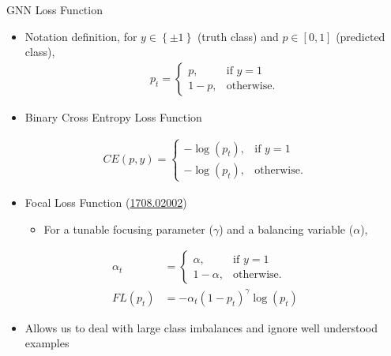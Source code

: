 \documentclass[xcolor=table,aspectratio=169]{beamer}
\begin{document}
\begin{frame}{GNN Loss Function}
    \begin{itemize}
        \item Notation definition, for \(y\in \left\{\pm 1\right\}\) (truth class) and \( p \in \left[ 0, 1 \right] \) (predicted class),
        \begin{align*}
            p_t = \left\{\begin{array}{lr}
                p, & \text{if } y=1\\
                1-p, & \text{otherwise.}
                \end{array}\right.
        \end{align*}
        \item Binary Cross Entropy Loss Function
    \end{itemize}
    \begin{align*}
        CE(p,y) = \left\{\begin{array}{lr}
            -\log(p_t), & \text{if } y=1\\
            -\log(p_t), & \text{otherwise.}
            \end{array}\right.
    \end{align*}
    \begin{itemize}
        \item Focal Loss Function (\href{https://arxiv.org/pdf/1708.02002}{1708.02002})
        \begin{itemize}
            \item For a tunable focusing parameter (\(\gamma\)) and a balancing variable (\(\alpha\)),
        \end{itemize}
    \end{itemize}
    \begin{align*}
        \alpha_t &= \left\{\begin{array}{lr}
                \alpha, & \text{if } y=1\\
                1-\alpha, & \text{otherwise.}
                \end{array}\right. \\
        FL(p_t) &= -\alpha_t \left( 1 - p_t \right)^\gamma \log(p_t)
    \end{align*}
    \begin{itemize}
        \item Allows us to deal with large class imbalances and ignore well understood examples
    \end{itemize}
\end{frame}
\end{document}
